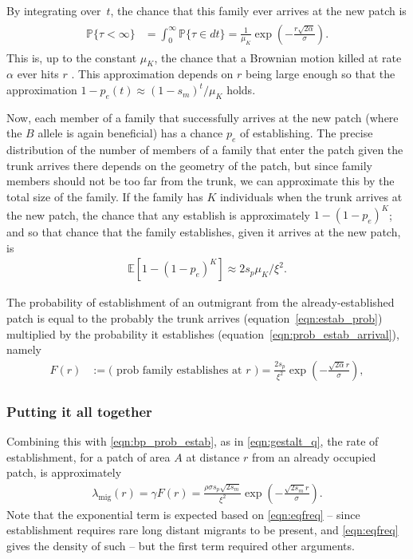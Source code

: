 \documentclass{article}
\renewcommand{\P}{\mathbb{P}}
\newcommand{\E}{\mathbb{E}}
\newcommand{\migrate}{\lambda_\text{mig}}
\begin{document}
By integrating over~$t$, the chance that this family ever arrives at the new patch is
\begin{align} 
\label{eqn:estab_prob}
  \begin{split}
      \P\{ \tau < \infty \} &= \int_0^\infty \P\{ \tau \in dt \} = \frac{1}{\mu_K} \exp\left( - \frac{ r \sqrt{2 \alpha}}{\sigma} \right) .
  \end{split}
\end{align}
This is, up to the constant $\mu_K$, the chance that a Brownian motion killed at rate $\alpha$
ever hits $r$ \citep{feller}.
This approximation depends on $r$ being large enough so that the approximation $1-p_e(t) \approx (1-s_m)^t/\mu_K$ holds.

Now, each member of a family that successfully arrives at the new patch
(where the $B$ allele is again beneficial)
has a chance $p_e$ of establishing.
The precise distribution of the number of members of a family that enter the patch
given the trunk arrives there
depends on the geometry of the patch,
but since family members should not be too far from the trunk,
we can approximate this by the total size of the family.
If the family has $K$ individuals when the trunk arrives at the new patch,
the chance that any establish is approximately $1-(1-p_e)^K$;
and so that chance that the family establishes, given it arrives at the new patch, 
is 
\begin{align}
    \label{eqn:prob_estab_arrival}
    \E[1-(1-p_e)^K] \approx 2 s_p \mu_K/\xi^2 .
\end{align}

The probability of establishment of an outmigrant from the already-established patch is 
equal to the probably the trunk arrives (equation~\eqref{eqn:estab_prob}) multiplied by the probability it establishes (equation~\eqref{eqn:prob_estab_arrival}),
namely
\begin{align} \label{eqn:bp_prob_estab}
    F(r) &:= \text{( prob family establishes at $r$ )} = \frac{2s_p}{\xi^2} \exp\left( - \frac{\sqrt{2 \alpha} r}{\sigma} \right) ,
\end{align}



\subsubsection*{Putting it all together}

Combining this with \eqref{eqn:bp_prob_estab}, as in \eqref{eqn:gestalt_q}, 
the rate of establishment, for a patch of area $A$ at distance $r$ from an already occupied patch, is approximately
\begin{align} \label{eqn:migrate}
    \migrate(r) = \gamma F(r) = \frac{\rho \sigma s_p\sqrt{2s_m} }{\xi^2}  \exp\left( -\frac{ \sqrt{2 s_m} r}{\sigma} \right).
\end{align}
Note that the exponential term is expected based on \eqref{eqn:eqfreq} -- 
since establishment requires rare long distant migrants to be present, and \eqref{eqn:eqfreq} gives the density of such --
but the first term required other arguments.
\end{document}
